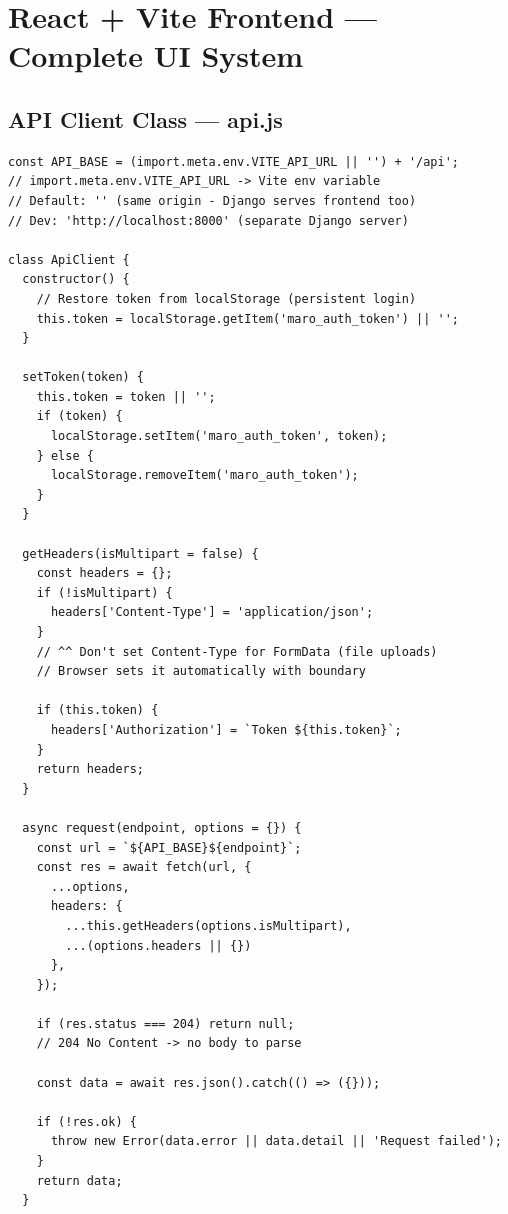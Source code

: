 \documentclass[11pt,a4paper,twoside]{report}
\begin{document}

\chapter{React + Vite Frontend --- Complete UI System}

\section{API Client Class --- api.js}

\begin{lstlisting}[style=jsstyle,caption={api.js --- Complete Client Architecture}]
const API_BASE = (import.meta.env.VITE_API_URL || '') + '/api';
// import.meta.env.VITE_API_URL -> Vite env variable
// Default: '' (same origin - Django serves frontend too)
// Dev: 'http://localhost:8000' (separate Django server)

class ApiClient {
  constructor() {
    // Restore token from localStorage (persistent login)
    this.token = localStorage.getItem('maro_auth_token') || '';
  }

  setToken(token) {
    this.token = token || '';
    if (token) {
      localStorage.setItem('maro_auth_token', token);
    } else {
      localStorage.removeItem('maro_auth_token');
    }
  }

  getHeaders(isMultipart = false) {
    const headers = {};
    if (!isMultipart) {
      headers['Content-Type'] = 'application/json';
    }
    // ^^ Don't set Content-Type for FormData (file uploads)
    // Browser sets it automatically with boundary

    if (this.token) {
      headers['Authorization'] = `Token ${this.token}`;
    }
    return headers;
  }

  async request(endpoint, options = {}) {
    const url = `${API_BASE}${endpoint}`;
    const res = await fetch(url, {
      ...options,
      headers: {
        ...this.getHeaders(options.isMultipart),
        ...(options.headers || {})
      },
    });

    if (res.status === 204) return null;
    // 204 No Content -> no body to parse

    const data = await res.json().catch(() => ({}));

    if (!res.ok) {
      throw new Error(data.error || data.detail || 'Request failed');
    }
    return data;
  }


\end{lstlisting}
\end{document}
